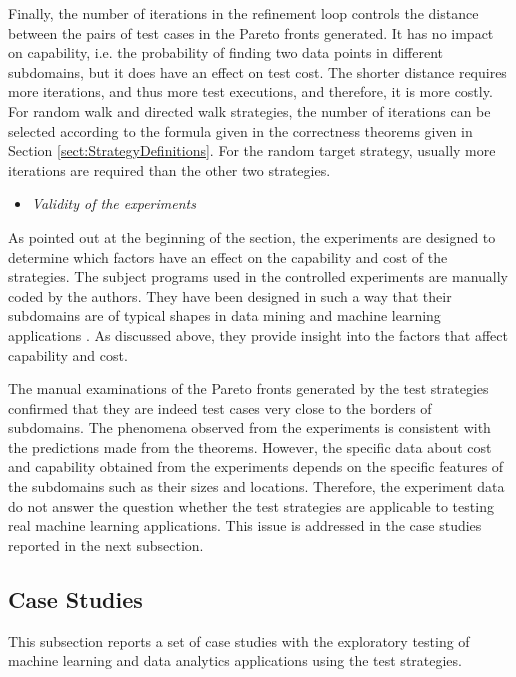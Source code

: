 \documentclass[preprint,1p,authoryear,times]{elsarticle}
\begin{document}
Finally, the number of iterations in the refinement loop controls the distance between the pairs of test cases in the Pareto fronts generated. It has no impact on capability, i.e. the probability of finding two data points in different subdomains, but it does have an effect on test cost. The shorter distance requires more iterations, and thus more test executions, and therefore, it is more costly. For random walk and directed walk strategies, the number of iterations can be selected according to the formula given in the correctness theorems given in Section \ref{sect:StrategyDefinitions}. For the random target strategy, usually more iterations are required than the other two strategies. 

\begin{itemize}
\item \emph{Validity of the experiments}
\end{itemize}

As pointed out at the beginning of the section, the experiments are designed to determine which factors have an effect on the capability and cost of the strategies. The subject programs used in the controlled experiments are manually coded by the authors. They have been designed in such a way that their subdomains are of typical shapes in data mining and machine learning applications \citep{DataMiningTextBook, FoundationsOfMLBook, UnderstandingMLBook}. As discussed above, they provide insight into the factors that affect capability and cost. 

The manual examinations of the Pareto fronts generated by the test strategies confirmed that they are indeed test cases very close to the borders of subdomains. The phenomena observed from the experiments is consistent with the predictions made from the theorems. However, the specific data about cost and capability obtained from the experiments depends on the specific features of the subdomains such as their sizes and locations. Therefore, the experiment data do not answer the question whether the test strategies are applicable to testing real machine learning applications. This issue is addressed in the case studies reported in the next subsection. 

\subsection{Case Studies}\label{sec:CaseStudy}

This subsection reports a set of case studies with the exploratory testing of machine learning and data analytics applications using the test strategies. 
\end{document}
